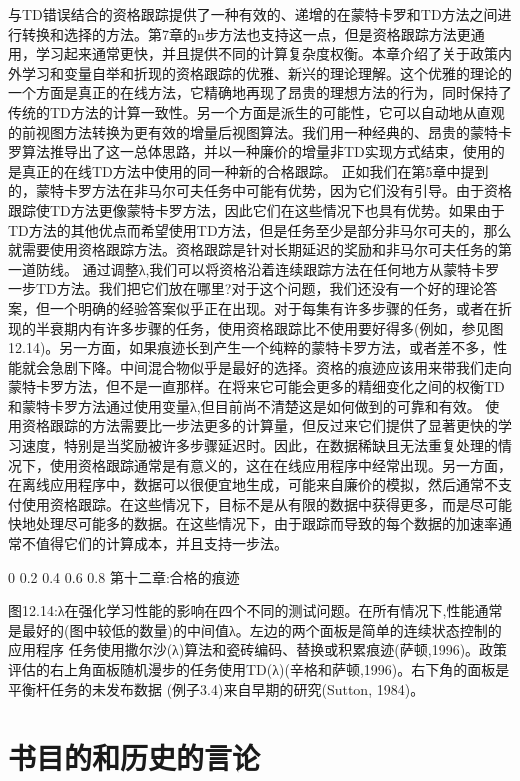与TD错误结合的资格跟踪提供了一种有效的、递增的在蒙特卡罗和TD方法之间进行转换和选择的方法。第7章的n步方法也支持这一点，但是资格跟踪方法更通用，学习起来通常更快，并且提供不同的计算复杂度权衡。本章介绍了关于政策内外学习和变量自举和折现的资格跟踪的优雅、新兴的理论理解。这个优雅的理论的一个方面是真正的在线方法，它精确地再现了昂贵的理想方法的行为，同时保持了传统的TD方法的计算一致性。另一个方面是派生的可能性，它可以自动地从直观的前视图方法转换为更有效的增量后视图算法。我们用一种经典的、昂贵的蒙特卡罗算法推导出了这一总体思路，并以一种廉价的增量非TD实现方式结束，使用的是真正的在线TD方法中使用的同一种新的合格跟踪。
正如我们在第5章中提到的，蒙特卡罗方法在非马尔可夫任务中可能有优势，因为它们没有引导。由于资格跟踪使TD方法更像蒙特卡罗方法，因此它们在这些情况下也具有优势。如果由于TD方法的其他优点而希望使用TD方法，但是任务至少是部分非马尔可夫的，那么就需要使用资格跟踪方法。资格跟踪是针对长期延迟的奖励和非马尔可夫任务的第一道防线。
通过调整λ,我们可以将资格沿着连续跟踪方法在任何地方从蒙特卡罗一步TD方法。我们把它们放在哪里?对于这个问题，我们还没有一个好的理论答案，但一个明确的经验答案似乎正在出现。对于每集有许多步骤的任务，或者在折现的半衰期内有许多步骤的任务，使用资格跟踪比不使用要好得多(例如，参见图12.14)。另一方面，如果痕迹长到产生一个纯粹的蒙特卡罗方法，或者差不多，性能就会急剧下降。中间混合物似乎是最好的选择。资格的痕迹应该用来带我们走向蒙特卡罗方法，但不是一直那样。在将来它可能会更多的精细变化之间的权衡TD和蒙特卡罗方法通过使用变量λ,但目前尚不清楚这是如何做到的可靠和有效。
使用资格跟踪的方法需要比一步法更多的计算量，但反过来它们提供了显著更快的学习速度，特别是当奖励被许多步骤延迟时。因此，在数据稀缺且无法重复处理的情况下，使用资格跟踪通常是有意义的，这在在线应用程序中经常出现。另一方面，在离线应用程序中，数据可以很便宜地生成，可能来自廉价的模拟，然后通常不支付使用资格跟踪。在这些情况下，目标不是从有限的数据中获得更多，而是尽可能快地处理尽可能多的数据。在这些情况下，由于跟踪而导致的每个数据的加速率通常不值得它们的计算成本，并且支持一步法。

0	0.2	0.4	0.6	0.8
第十二章:合格的痕迹
 
 


图12.14:λ在强化学习性能的影响在四个不同的测试问题。在所有情况下,性能通常是最好的(图中较低的数量)的中间值λ。左边的两个面板是简单的连续状态控制的应用程序
任务使用撒尔沙(λ)算法和瓷砖编码、替换或积累痕迹(萨顿,1996)。政策评估的右上角面板随机漫步的任务使用TD(λ)(辛格和萨顿,1996)。右下角的面板是平衡杆任务的未发布数据
(例子3.4)来自早期的研究(Sutton, 1984)。

\section{书目的和历史的言论}

